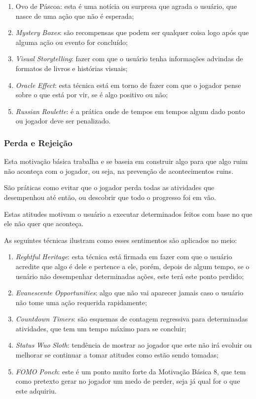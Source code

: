 \begin{enumerate}
    \item Ovo de Páscoa: esta é uma notícia ou surpresa que agrada o usuário,
        que nasce de uma ação que não é esperada;
    \item \textit{Mystery} \textit{Boxes}: são recompensas que podem ser qualquer coisa
        logo após que alguma ação ou evento for concluído;
    \item \textit{Visual} \textit{Storytelling}: fazer com que o usuário tenha informações
        advindas de formatos de livros e histórias
        visuais;
    \item \textit{Oracle} \textit{Effect}: esta técnica está em torno de fazer com que o
        jogador pense sobre o que está por vir, se é algo positivo ou não;
    \item \textit{Russian} \textit{Roulette}: é a prática onde de tempos em tempos algum dado ponto
        ou jogador deve ser penalizado.
\end{enumerate}

\subsubsection{Perda e Rejeição}
\label{sub:perdaerejeicao}
Esta motivação básica trabalha e se baseia em construir algo para que algo ruim não
aconteça com o jogador, ou seja, na prevenção de acontecimentos ruins.

São práticas como evitar que o jogador perda todas as atividades que desempenhou
até então, ou descobrir que todo o progresso foi em vão.

Estas atitudes motivam o usuário a executar determinados feitos com base no que
ele não quer que aconteça.

As seguintes técnicas ilustram como esses sentimentos são aplicados no meio:

\begin{enumerate}
    \item \textit{Reghtful} \textit{Heritage}: esta técnica está firmada em fazer com que o usuário
        acredite que algo é dele e pertence a ele, porém, depois de algum tempo,
        se o usuário não desempenhar determinadas ações, este terá este ponto
        perdido;
    \item \textit{Evanescente} \textit{Opportunities}: algo que não vai aparecer jamais
        caso o usuário não tome uma ação requerida rapidamente;
    \item \textit{Countdown} \textit{Timers}: são esquemas de contagem regressiva para determinadas
        atividades, que tem um tempo máximo para se concluir;
    \item \textit{Status} \textit{Wuo} \textit{Sloth}: tendência de mostrar ao jogador que este não irá evoluir ou melhorar se continuar
        a tomar atitudes como estão sendo tomadas;
    \item \textit{FOMO} \textit{Ponch}: este é um ponto muito forte da Motivação Básica 8, que tem como
        pretexto gerar no jogador um medo de perder, seja já qual for o que
        este adquiriu.
\end{enumerate}

